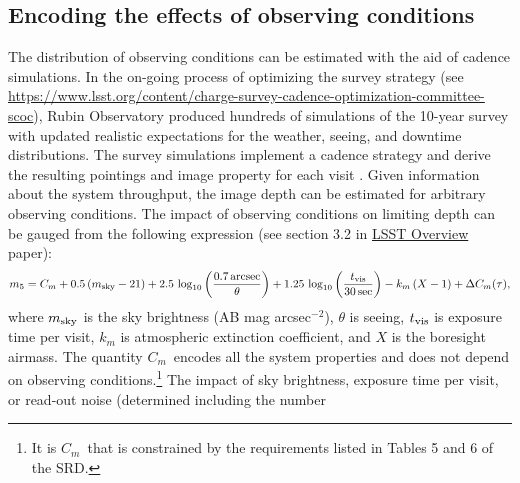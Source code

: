 \documentclass[PST,authoryear,toc]{lsstdoc}
\newcommand{\cm}{\ensuremath{C_m}}
\newcommand{\mf}{\ensuremath{m_5}}
\begin{document}
\subsection{Encoding the effects of observing conditions}\label{sec:Cm}

The distribution of observing conditions can be estimated with the aid of cadence simulations.  In the on-going process of optimizing the survey strategy (see \href{https://www.lsst.org/content/charge-survey-cadence-optimization-committee-scoc}{{https://www.lsst.org/content/charge-survey-cadence-optimization-committee-scoc}}), Rubin Observatory produced hundreds of simulations of the 10-year survey with updated realistic expectations for the weather, seeing, and downtime distributions.  The survey simulations implement a cadence strategy and derive the resulting pointings and image property for each visit \citep{2019AJ....157..151N, 2016SPIE.9910E..13D, 2014SPIE.9150E..15D}. 
Given information about the system throughput, the image depth can be estimated for arbitrary observing conditions. The impact of observing conditions on limiting depth 
can be gauged from the following expression (see section 3.2 in
\href{https://ls.st/lop}{{LSST Overview}} paper): 
\begin{equation}
\label{eq:Cm}
m_5 = \cm + 0.5\,(m_{\rm sky} - 21) + 2.5\,\log_{10}\left(\frac{0.7 \, {\rm arcsec}}{\theta}\right) + 1.25\,\log_{10}\left(\frac{t_{\rm vis}}{ 30 \, {\rm sec}}\right) - k_m\,(X-1) + \Delta\cm(\tau),
\end{equation}
where $m_{\rm sky}$ is the sky brightness (AB mag arcsec$^{-2}$), $\theta$ is seeing, $t_{\rm vis}$ is exposure 
time per visit, $k_m$ is atmospheric extinction coefficient, and $X$ is the boresight airmass. 
The quantity \cm\ encodes all the system properties and does not depend on observing conditions.\footnote{It is \cm\ that is constrained by the requirements listed in Tables 5 and 6 of the SRD.}
The impact of sky brightness, exposure time per visit, or read-out noise (determined including the number 
\end{document}
